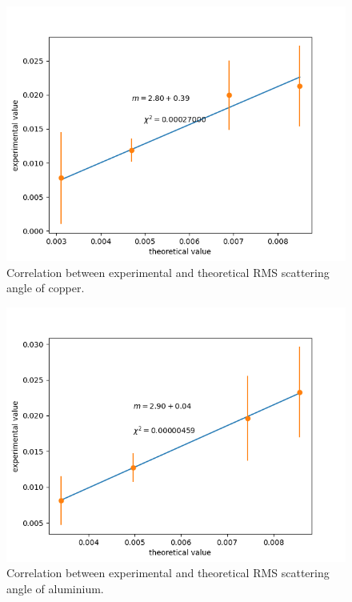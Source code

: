 \documentclass[sn-mathphys-num,iicol]{sn-jnl}
\theoremstyle{thmstyleone}
\theoremstyle{thmstyletwo}
\theoremstyle{thmstylethree}
\begin{document}
\begin{figure}
  \includegraphics[width=0.9\linewidth]{../src/elsa/finished_plots/Copper.png}
  \caption{Correlation between experimental and theoretical RMS scattering angle of copper.}
  \label{fig:correlation_cop}  
\end{figure}

\begin{figure}
  \includegraphics[width=0.9\linewidth]{../src/elsa/finished_plots/Aluminium.png}
  \caption{Correlation between experimental and theoretical RMS scattering angle of aluminium.}
  \label{fig:correlation_alu}  
\end{figure}
\end{document}
